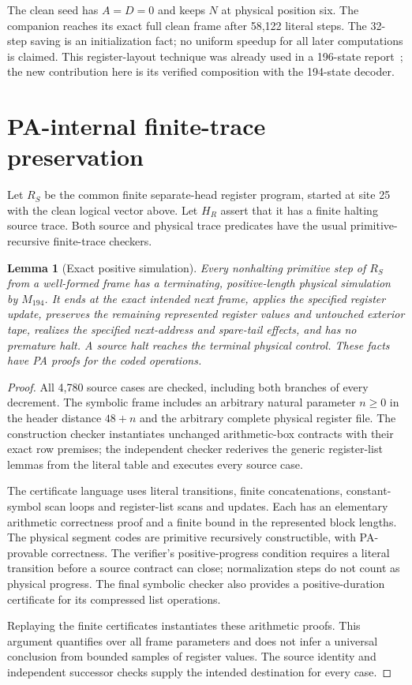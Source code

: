 \documentclass[11pt,letterpaper]{article}
\newcommand{\MX}{M_{194}}
\newtheorem{lemma}[theorem]{Lemma}
\begin{document}
The clean seed has $A=D=0$ and keeps $N$ at physical position six.
The companion reaches its exact full clean frame after 58,122 literal
steps. The 32-step saving is an initialization fact; no uniform speedup
for all later computations is claimed. This register-layout technique
was already used in a 196-state report~\cite{register}; the new contribution
here is its verified composition with the 194-state decoder.

\section{PA-internal finite-trace preservation}
\label{sec:preservation}

Let $R_S$ be the common finite separate-head register program, started at
site 25 with the clean logical vector above. Let $H_R$ assert that it has
a finite halting source trace. Both source and physical trace predicates
have the usual primitive-recursive finite-trace checkers.

\begin{lemma}[Exact positive simulation]
Every nonhalting primitive step of $R_S$ from a well-formed frame has a
terminating, positive-length physical simulation by $\MX$. It ends at
the exact intended next frame, applies the specified register update,
preserves the remaining represented register values and untouched exterior
tape, realizes the specified next-address and spare-tail effects, and has
no premature halt.
A source halt reaches the terminal physical control. These facts have
PA proofs for the coded operations.
\end{lemma}
\begin{proof}
All 4,780 source cases are checked, including both branches of every
decrement. The symbolic frame includes an arbitrary natural parameter $n\ge0$ in the header distance $48+n$
and the arbitrary complete physical register file. The construction checker
instantiates unchanged arithmetic-box contracts with their exact row
premises; the independent checker rederives the generic register-list
lemmas from the literal table and executes every source case.

The certificate language uses literal transitions, finite concatenations,
constant-symbol scan loops and register-list scans and updates. Each has
an elementary arithmetic correctness proof and a finite bound in the
represented block lengths. The physical segment codes are primitive
recursively constructible, with PA-provable correctness. The verifier's
positive-progress condition requires a literal transition before a
source contract can close; normalization steps do not count as physical
progress. The final symbolic checker also provides a positive-duration
certificate for its compressed list operations.

Replaying the finite certificates instantiates these arithmetic proofs.
This argument quantifies over all frame parameters and does not infer a
universal conclusion from bounded samples of register values. The source
identity and independent successor checks supply the intended destination
for every case.
\end{proof}
\end{document}
